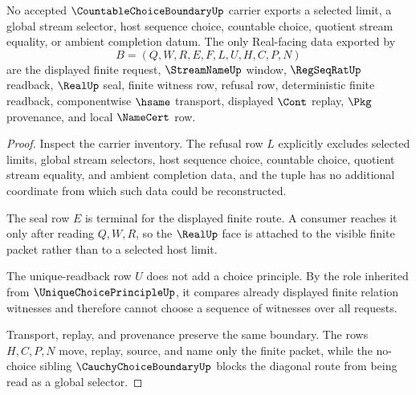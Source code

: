 \begin{theorem}
\label{thm:countable-choice-boundary-no-selected-limit}
No accepted $\CountableChoiceBoundaryUp$ carrier exports a selected limit, a global stream selector, host sequence choice, countable choice, quotient stream equality, or ambient completion datum. The only Real-facing data exported by
$$
B=(Q,W,R,E,F,L,U,H,C,P,N)
$$
are the displayed finite request, $\StreamNameUp$ window, $\RegSeqRatUp$ readback, $\RealUp$ seal, finite witness row, refusal row, deterministic finite readback, componentwise $\hsame$ transport, displayed $\Cont$ replay, $\Pkg$ provenance, and local $\NameCert$ row.
\end{theorem}
\begin{proof}
Inspect the carrier inventory. The refusal row $L$ explicitly excludes selected limits, global stream selectors, host sequence choice, countable choice, quotient stream equality, and ambient completion data, and the tuple has no additional coordinate from which such data could be reconstructed.

The seal row $E$ is terminal for the displayed finite route. A consumer reaches it only after reading $Q,W,R$, so the $\RealUp$ face is attached to the visible finite packet rather than to a selected host limit.

The unique-readback row $U$ does not add a choice principle. By the role inherited from $\UniqueChoicePrincipleUp$, it compares already displayed finite relation witnesses and therefore cannot choose a sequence of witnesses over all requests.

Transport, replay, and provenance preserve the same boundary. The rows $H,C,P,N$ move, replay, source, and name only the finite packet, while the no-choice sibling $\CauchyChoiceBoundaryUp$ blocks the diagonal route from being read as a global selector.
\end{proof}

